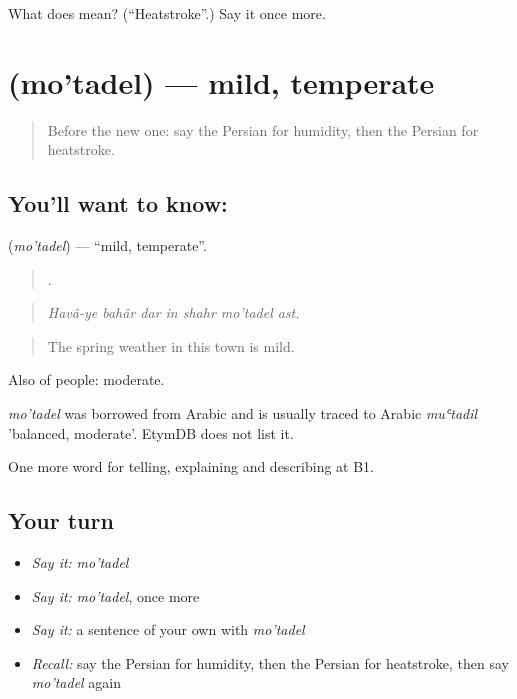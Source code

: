 \begin{tcolorbox}[breakable,colback=teal!4,colframe=teal!35!black,title={Before you move on}]
What does  mean? (\textquotedblleft{}Heatstroke\textquotedblright{}.) Say it once more.
\end{tcolorbox}
\section[\texorpdfstring{\fa{معتدل} (mo'tadel)}{معتدل (mo'tadel)}]{ (mo'tadel) — mild, temperate}

\label{lesson:FA-C477-motadel}



\begin{quote}
Before the new one: say the Persian for humidity, then the Persian for heatstroke.
\end{quote}

\subsection*{You'll want to know: }
\textbf{} (\emph{mo'tadel}) — \textquotedblleft{}mild, temperate\textquotedblright{}.

\begin{quote}
      .
\end{quote}

\begin{quote}
\emph{Havâ-ye bahâr dar in shahr mo'tadel ast.}
\end{quote}

\begin{quote}
The spring weather in this town is mild.
\end{quote}

Also of people: moderate.

\begin{cousinweb}
\emph{mo'tadel} was borrowed from Arabic and is usually traced to Arabic \emph{muʿtadil} 'balanced, moderate'. EtymDB does not list it.
\end{cousinweb}

\begin{grammarlens}[title={What you've built}]
One more word for telling, explaining and describing at B1.
\end{grammarlens}

\subsection*{Your turn}
\begin{itemize}
\raggedright
  \item \emph{Say it:} \emph{mo'tadel}
  \item \emph{Say it:} \emph{mo'tadel}, once more
  \item \emph{Say it:} a sentence of your own with \emph{mo'tadel}
  \item \emph{Recall:} say the Persian for humidity, then the Persian for heatstroke, then say \emph{mo'tadel} again
\end{itemize}

